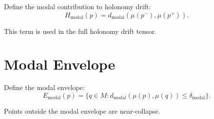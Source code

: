 \documentclass[11pt]{article}
\begin{document}
Define the modal contribution to holonomy drift:
\[
H_{\mathrm{modal}}(p)
  = d_{\mathrm{modal}}(\mu(p^-), \mu(p^+)).
\]

This term is used in the full holonomy drift tensor.

\section{Modal Envelope}

Define the modal envelope:
\[
E_{\mathrm{modal}}(p)
  = \{ q \in M : d_{\mathrm{modal}}(\mu(p), \mu(q)) \le \delta_{\mathrm{modal}} \}.
\]

Points outside the modal envelope are near-collapse.
\end{document}
